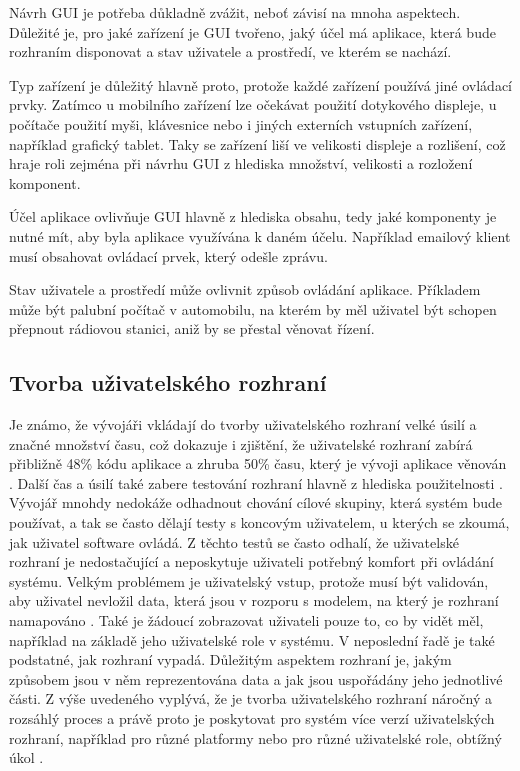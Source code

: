 Návrh GUI je potřeba důkladně zvážit, neboť závisí na mnoha aspektech. Důležité je, pro jaké zařízení je GUI tvořeno, jaký účel má aplikace, která bude rozhraním disponovat a stav uživatele a prostředí, ve kterém se nachází. 

Typ zařízení je důležitý hlavně proto, protože každé zařízení používá jiné ovládací prvky. Zatímco u mobilního zařízení lze očekávat použití dotykového displeje, u počítače použití myši, klávesnice nebo i jiných externích vstupních zařízení, například grafický tablet. Taky se zařízení liší ve velikosti displeje a rozlišení, což hraje roli zejména při návrhu GUI z hlediska množství, velikosti a rozložení komponent.

Účel aplikace ovlivňuje GUI hlavně z hlediska obsahu, tedy jaké komponenty je nutné mít, aby byla aplikace využívána k daném účelu. Například emailový klient musí obsahovat ovládací prvek, který odešle zprávu. 

Stav uživatele a prostředí může ovlivnit způsob ovládání aplikace. Příkladem může být palubní počítač v automobilu, na kterém by měl uživatel být schopen přepnout rádiovou stanici, aniž by se přestal věnovat řízení. 


\subsection{Tvorba uživatelského rozhraní}

Je známo, že vývojáři vkládají do tvorby uživatelského rozhraní velké úsilí a značné množství času, což dokazuje i zjištění, že uživatelské rozhraní zabírá přibližně 48\% kódu aplikace a zhruba 50\% času, který je vývoji aplikace věnován \cite{towards-smart-design}. Další čas a úsilí také zabere testování rozhraní hlavně z hlediska použitelnosti \cite{usability}. Vývojář mnohdy nedokáže odhadnout chování cílové skupiny, která systém bude používat, a tak se často dělají testy s koncovým uživatelem, u kterých se zkoumá, jak uživatel software ovládá. Z těchto testů se často odhalí, že uživatelské rozhraní je nedostačující a neposkytuje uživateli potřebný komfort při ovládání systému. Velkým problémem je uživatelský vstup, protože musí být validován, aby uživatel nevložil data, která jsou v rozporu s modelem, na který je rozhraní namapováno \cite{cernyTEA}. Také je žádoucí zobrazovat uživateli pouze to, co by vidět měl, například na základě jeho uživatelské role v systému. V neposlední řadě je také podstatné, jak rozhraní vypadá. Důležitým aspektem rozhraní je, jakým způsobem jsou v něm reprezentována data a jak jsou uspořádány jeho jednotlivé části. Z výše uvedeného vyplývá, že je tvorba uživatelského rozhraní náročný a rozsáhlý proces a právě proto je poskytovat pro systém více verzí uživatelských rozhraní, například pro různé platformy nebo pro různé uživatelské role, obtížný úkol \cite{cernyTEA}.

